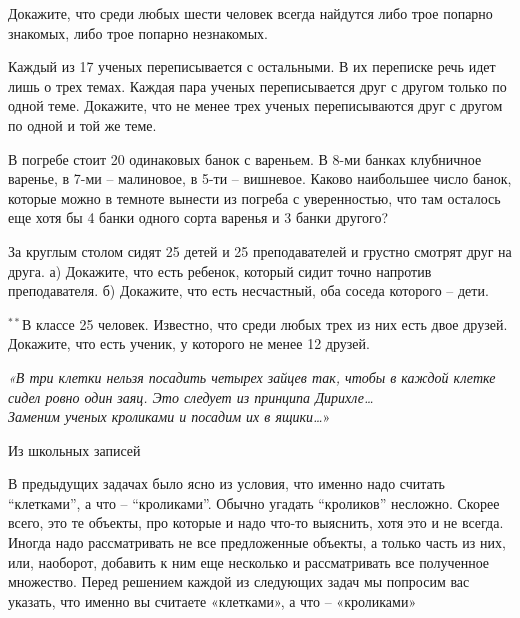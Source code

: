 \begin{thm}
	Докажите, что среди любых шести человек всегда найдутся либо трое попарно знакомых, либо трое попарно незнакомых.
\end{thm}

\begin{thm}
	Каждый из 17 ученых переписывается с остальными. В их переписке речь идет лишь о трех темах. Каждая пара ученых переписывается друг с другом только по одной теме. Докажите, что не менее трех ученых переписываются друг с другом по одной и той же теме.
\end{thm}

\begin{thm}
	В погребе стоит 20 одинаковых банок с вареньем. В 8-ми банках клубничное варенье, в 7-ми – малиновое, в 5-ти – вишневое. Каково наибольшее число банок, которые можно в темноте вынести из погреба с уверенностью, что там осталось еще хотя бы 4 банки одного сорта варенья и 3 банки другого? 
\end{thm}

\begin{thm}
	За круглым столом сидят 25 детей и 25 преподавателей и грустно смотрят друг на друга.
	а) Докажите, что есть ребенок, который сидит точно напротив преподавателя.
	б) Докажите, что есть несчастный, оба соседа которого – дети.
\end{thm}
\begin{thm}
	$^{\ast\ast}$В классе 25 человек. Известно, что среди любых трех из них есть двое друзей. Докажите, что есть ученик, у которого не менее 12 друзей.
\end{thm}


\epigraph{ \textit{«В три клетки нельзя посадить четырех зайцев так, чтобы в каждой клетке сидел ровно один заяц. Это следует из принципа Дирихле\dots} \\ \textit{Заменим ученых кроликами и посадим их в ящики\dots}»}{Из школьных записей}
В предыдущих задачах было ясно из условия, что именно надо считать “клетками”, а что – “кроликами”. Обычно угадать “кроликов” несложно. Скорее всего, это те объекты, про которые и надо что-то выяснить, хотя это и не всегда. Иногда надо рассматривать не все предложенные объекты, а только часть из них, или, наоборот, добавить к ним еще несколько и рассматривать все полученное множество. Перед решением каждой из следующих задач мы попросим вас указать, что именно вы считаете «клетками», а что – «кроликами»

